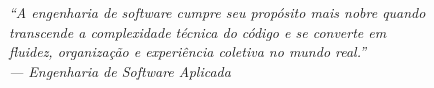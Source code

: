 \begin{epigrafe}
\vspace*{\fill}
\begin{flushright}
\emph{``A engenharia de software cumpre seu propósito mais nobre quando\\
transcende a complexidade técnica do código e se converte em\\
fluidez, organização e experiência coletiva no mundo real.''\\
--- Engenharia de Software Aplicada}
\end{flushright}
\end{epigrafe}
